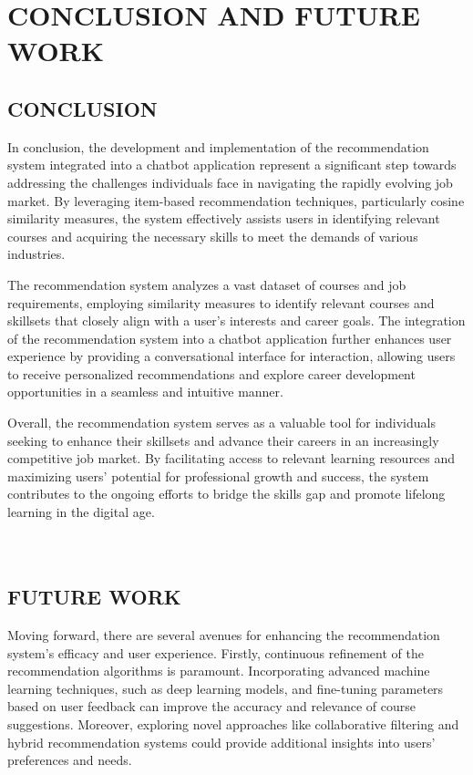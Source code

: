 \chapter{\uppercase{Conclusion and Future Work}}
\label{chap:conclusion}
\section{\uppercase{Conclusion}}
In conclusion, the development and implementation of the recommendation system integrated into a chatbot application represent a significant step towards addressing the challenges individuals face in navigating the rapidly evolving job market. By leveraging item-based recommendation techniques, particularly cosine similarity measures, the system effectively assists users in identifying relevant courses and acquiring the necessary skills to meet the demands of various industries.

The recommendation system analyzes a vast dataset of courses and job requirements, employing similarity measures to identify relevant courses and skillsets that closely align with a user's interests and career goals. The integration of the recommendation system into a chatbot application further enhances user experience by providing a conversational interface for interaction, allowing users to receive personalized recommendations and explore career development opportunities in a seamless and intuitive manner.

Overall, the recommendation system serves as a valuable tool for individuals seeking to enhance their skillsets and advance their careers in an increasingly competitive job market. By facilitating access to relevant learning resources and maximizing users' potential for professional growth and success, the system contributes to the ongoing efforts to bridge the skills gap and promote lifelong learning in the digital age.
\\ \\ \\

\section{\uppercase{Future Work}}

Moving forward, there are several avenues for enhancing the recommendation system's efficacy and user experience. Firstly, continuous refinement of the recommendation algorithms is paramount. Incorporating advanced machine learning techniques, such as deep learning models, and fine-tuning parameters based on user feedback can improve the accuracy and relevance of course suggestions. Moreover, exploring novel approaches like collaborative filtering and hybrid recommendation systems could provide additional insights into users' preferences and needs.

